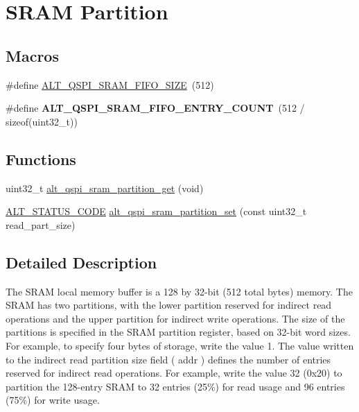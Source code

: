 \hypertarget{group__ALT__QSPI__CFG__SRAM}{}\section{S\+R\+AM Partition}
\label{group__ALT__QSPI__CFG__SRAM}
\subsection*{Macros}
\begin{DoxyCompactItemize}
\item 
\#define \mbox{\hyperlink{group__ALT__QSPI__CFG__SRAM_gadfc85605a06cbd2925967039f1533fdd}{A\+L\+T\+\_\+\+Q\+S\+P\+I\+\_\+\+S\+R\+A\+M\+\_\+\+F\+I\+F\+O\+\_\+\+S\+I\+ZE}}~(512)
\item 
\mbox{\label{group__ALT__QSPI__CFG__SRAM_gab457cff37bedf4d892f5e66ac1c554d2}} 
\#define {\bfseries A\+L\+T\+\_\+\+Q\+S\+P\+I\+\_\+\+S\+R\+A\+M\+\_\+\+F\+I\+F\+O\+\_\+\+E\+N\+T\+R\+Y\+\_\+\+C\+O\+U\+NT}~(512 / sizeof(uint32\+\_\+t))
\end{DoxyCompactItemize}
\subsection*{Functions}
\begin{DoxyCompactItemize}
\item 
uint32\+\_\+t \mbox{\hyperlink{group__ALT__QSPI__CFG__SRAM_ga8c07c0b8537b8ecf939809e82ddcf789}{alt\+\_\+qspi\+\_\+sram\+\_\+partition\+\_\+get}} (void)
\item 
\mbox{\hyperlink{hwlib_8h_abdb0d369f069723ca55d6c94bcaaaa12}{A\+L\+T\+\_\+\+S\+T\+A\+T\+U\+S\+\_\+\+C\+O\+DE}} \mbox{\hyperlink{group__ALT__QSPI__CFG__SRAM_ga7852658f96558099c7c27a761e4ba2cc}{alt\+\_\+qspi\+\_\+sram\+\_\+partition\+\_\+set}} (const uint32\+\_\+t read\+\_\+part\+\_\+size)
\end{DoxyCompactItemize}


\subsection{Detailed Description}
The S\+R\+AM local memory buffer is a 128 by 32-\/bit (512 total bytes) memory. The S\+R\+AM has two partitions, with the lower partition reserved for indirect read operations and the upper partition for indirect write operations. The size of the partitions is specified in the S\+R\+AM partition register, based on 32-\/bit word sizes. For example, to specify four bytes of storage, write the value 1. The value written to the indirect read partition size field ( addr ) defines the number of entries reserved for indirect read operations. For example, write the value 32 (0x20) to partition the 128-\/entry S\+R\+AM to 32 entries (25\%) for read usage and 96 entries (75\%) for write usage.


